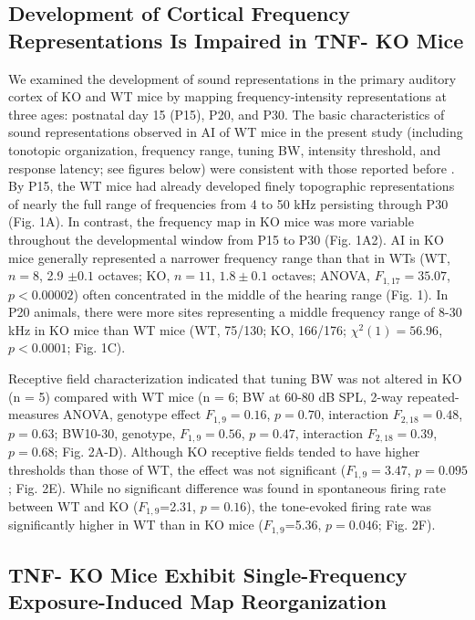 \subsection{Development of Cortical Frequency Representations Is Impaired in TNF-\textalpha{}  KO Mice}

We examined the development of sound representations in the primary auditory cortex of KO and WT mice by mapping frequency-intensity representations at three ages: postnatal day 15 (P15), P20, and P30. The basic characteristics of sound representations observed in AI of WT mice in the present study (including tonotopic organization, frequency range, tuning BW, intensity threshold, and response latency; see figures below) were consistent with those reported before \cite{Guo2012}. By P15, the WT mice had already developed finely topographic representations of nearly the full range of frequencies from 4 to 50 kHz persisting through P30 (Fig. 1A). In contrast, the frequency map in KO mice was more variable throughout the developmental window from P15 to P30 (Fig. 1A2). AI in KO mice generally represented a narrower frequency range than that in WTs (WT, $n = 8$, 2.9 $\pm0.1$ octaves; KO, $n = 11$, $1.8\pm0.1$ octaves; ANOVA, $F_{1,17}=35.07$, $p<0.00002$) often concentrated in the middle of the hearing range (Fig. 1). In P20 animals, there were more sites representing a middle frequency range of 8-30 kHz in KO mice than WT mice (WT, 75/130; KO, 166/176; $\chi^2(1)=56.96$, $p<0.0001$; Fig. 1C).

Receptive field characterization indicated that tuning BW was not altered in KO (n = 5) compared with WT mice (n = 6; BW at 60-80 dB SPL, 2-way repeated-measures ANOVA, genotype effect $F_{1,9}=0.16$, $p=0.70$, interaction $F_{2,18}=0.48$, $p=0.63$; BW10-30, genotype, $F_{1,9}=0.56$, $p=0.47$, interaction $F_{2,18}=0.39$, $p=0.68$; Fig. 2A-D). Although KO receptive fields tended to have higher thresholds than those of WT, the effect was not significant ($F_{1,9}=3.47$, $p=0.095$; Fig. 2E). While no significant difference was found in spontaneous firing rate between WT and KO ($F_{1,9}$=2.31, $p=0.16$), the tone-evoked firing rate was significantly higher in WT than in KO mice ($F_{1,9}$=5.36, $p=0.046$; Fig. 2F).

\subsection{TNF-\textalpha{} KO Mice Exhibit Single-Frequency Exposure-Induced Map Reorganization}

